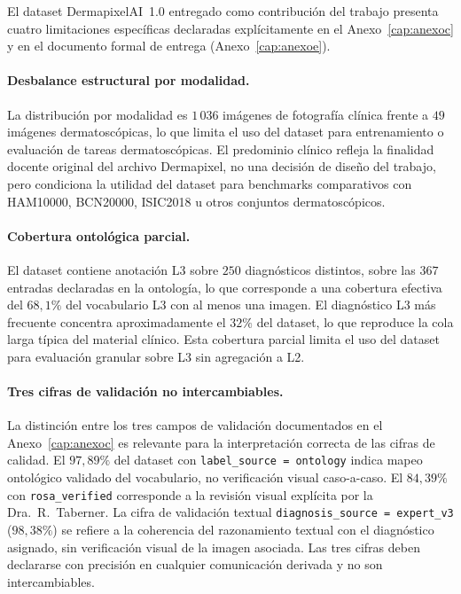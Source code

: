 El dataset DermapixelAI~1.0 entregado como contribución del trabajo
presenta cuatro limitaciones específicas declaradas explícitamente
en el Anexo~\ref{cap:anexoc} y en el documento formal de entrega
(Anexo~\ref{cap:anexoe}).

\paragraph{Desbalance estructural por modalidad.}
La distribución por modalidad es $1\,036$ imágenes de fotografía
clínica frente a $49$ imágenes dermatoscópicas, lo que limita
el uso del dataset para entrenamiento o evaluación de tareas
dermatoscópicas. El predominio clínico refleja la finalidad
docente original del archivo Dermapixel, no una decisión de
diseño del trabajo, pero condiciona la utilidad del dataset para
benchmarks comparativos con HAM10000, BCN20000, ISIC2018 u otros
conjuntos dermatoscópicos.

\paragraph{Cobertura ontológica parcial.}
El dataset contiene anotación L3 sobre $250$ diagnósticos
distintos, sobre las $367$ entradas declaradas en la
ontología, lo que corresponde a una cobertura efectiva del
$68{,}1\%$ del vocabulario L3 con al menos una imagen. El
diagnóstico L3 más frecuente concentra aproximadamente el
$32\%$ del dataset, lo que reproduce la cola larga típica del
material clínico. Esta cobertura parcial limita el uso del dataset
para evaluación granular sobre L3 sin agregación a L2.

\paragraph{Tres cifras de validación no intercambiables.}
La distinción entre los tres campos de validación documentados en
el Anexo~\ref{cap:anexoc} es relevante para la interpretación
correcta de las cifras de calidad. El $97{,}89\%$ del dataset
con \texttt{label\_source = ontology} indica mapeo ontológico
validado del vocabulario, no verificación visual caso-a-caso. El
$84{,}39\%$ con \texttt{rosa\_verified} corresponde a la revisión
visual explícita por la Dra.~R.~Taberner. La cifra de validación
textual \texttt{diagnosis\_source = expert\_v3} ($98{,}38\%$) se
refiere a la coherencia del razonamiento textual con el
diagnóstico asignado, sin verificación visual de la imagen
asociada. Las tres cifras deben declararse con precisión en
cualquier comunicación derivada y no son intercambiables.

